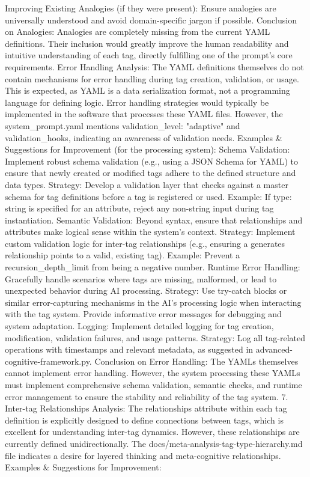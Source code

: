 {Improving Existing Analogies (if they were present): Ensure analogies are universally understood and avoid domain-specific jargon if possible. Conclusion on Analogies: Analogies are completely missing from the current YAML definitions. Their inclusion would greatly improve the human readability and intuitive understanding of each tag, directly fulfilling one of the prompt's core requirements.
Error Handling Analysis: The YAML definitions themselves do not contain mechanisms for error handling during tag creation, validation, or usage. This is expected, as YAML is a data serialization format, not a programming language for defining logic. Error handling strategies would typically be implemented in the software that processes these YAML files. However, the system_prompt.yaml mentions validation_level: "adaptive" and validation_hooks, indicating an awareness of validation needs. Examples & Suggestions for Improvement (for the processing system):
Schema Validation: Implement robust schema validation (e.g., using a JSON Schema for YAML) to ensure that newly created or modified tags adhere to the defined structure and data types.
Strategy: Develop a validation layer that checks against a master schema for tag definitions before a tag is registered or used.
Example: If type: string is specified for an attribute, reject any non-string input during tag instantiation.
Semantic Validation: Beyond syntax, ensure that relationships and attributes make logical sense within the system's context.
Strategy: Implement custom validation logic for inter-tag relationships (e.g., ensuring a generates relationship points to a valid, existing tag).
Example: Prevent a recursion_depth_limit from being a negative number.
Runtime Error Handling: Gracefully handle scenarios where tags are missing, malformed, or lead to unexpected behavior during AI processing.
Strategy: Use try-catch blocks or similar error-capturing mechanisms in the AI's processing logic when interacting with the tag system. Provide informative error messages for debugging and system adaptation.
Logging: Implement detailed logging for tag creation, modification, validation failures, and usage patterns.
Strategy: Log all tag-related operations with timestamps and relevant metadata, as suggested in advanced-cognitive-framework.py. Conclusion on Error Handling: The YAMLs themselves cannot implement error handling. However, the system processing these YAMLs must implement comprehensive schema validation, semantic checks, and runtime error management to ensure the stability and reliability of the tag system. 7. Inter-tag Relationships Analysis: The relationships attribute within each tag definition is explicitly designed to define connections between tags, which is excellent for understanding inter-tag dynamics. However, these relationships are currently defined unidirectionally. The docs/meta-analysis-tag-type-hierarchy.md file indicates a desire for layered thinking and meta-cognitive relationships. Examples & Suggestions for Improvement:
}
